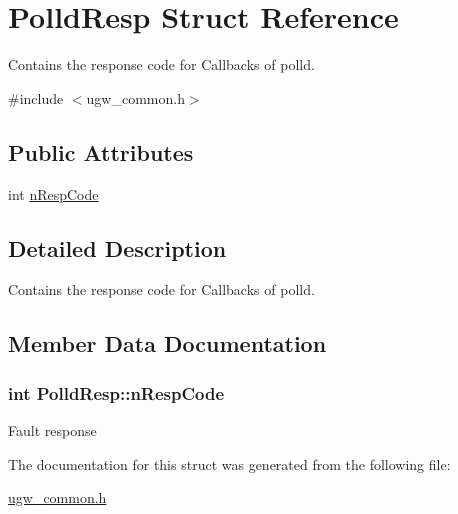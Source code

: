 \hypertarget{structPolldResp}{\section{Polld\-Resp Struct Reference}
\label{structPolldResp}
}


Contains the response code for Callbacks of polld.  




{\ttfamily \#include $<$ugw\-\_\-common.\-h$>$}

\subsection*{Public Attributes}
\begin{DoxyCompactItemize}
\item 
int \hyperlink{structPolldResp_ac9a283fa3aab2c01be0027cb5dd66e48}{n\-Resp\-Code}
\end{DoxyCompactItemize}


\subsection{Detailed Description}
Contains the response code for Callbacks of polld. 

\subsection{Member Data Documentation}
\hypertarget{structPolldResp_ac9a283fa3aab2c01be0027cb5dd66e48}{
\subsubsection[{n\-Resp\-Code}]{\setlength{\rightskip}{0pt plus 5cm}int Polld\-Resp\-::n\-Resp\-Code}}\label{structPolldResp_ac9a283fa3aab2c01be0027cb5dd66e48}
Fault response 

The documentation for this struct was generated from the following file\-:\begin{DoxyCompactItemize}
\item 
\hyperlink{ugw__common_8h}{ugw\-\_\-common.\-h}\end{DoxyCompactItemize}
